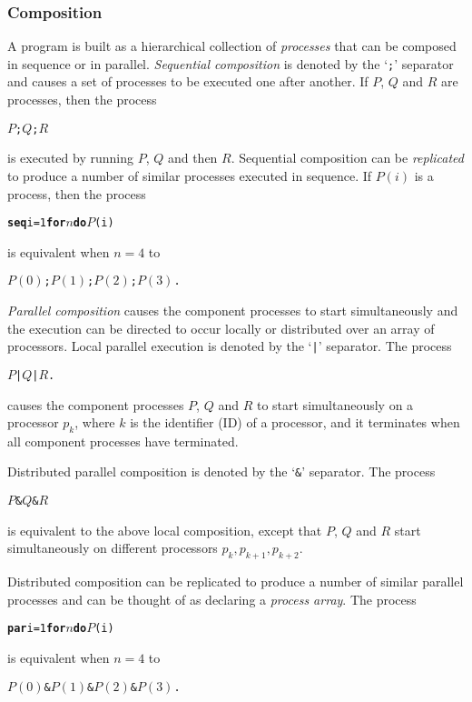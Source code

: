 \documentclass[11pt, conference, compsocconf, onecolumn]{IEEEtran}
\newcommand{\ttt}[1]{\texttt{#1}}
\newcounter{process}
\newcommand{\w}[1]{{\bf #1}}
\newcommand{\inputtikz}[1]{
\begin{center}\end{center}}
\def\codespacing{1.5mm}
\newenvironment{myquote}
{\list{}{\leftmargin=4mm\rightmargin=4mm}\item[]}
{\endlist}
\newcommand{\code}[1]{
\vspace{\codespacing}\begin{myquote}\begin{alltt}#1\end{alltt}\end{myquote}\vspace{\codespacing}
}
\begin{document}
\subsubsection{Composition}

A program is built as a hierarchical collection of \emph{processes} that can be
composed in sequence or in parallel. \emph{Sequential composition} is denoted
by the `\ttt{;}' separator and causes a set of processes to be executed one
after another. If $P$, $Q$ and $R$ are processes, then the process 
\code{$P$ ; $Q$ ; $R$} 
is executed by running $P$, $Q$ and then $R$.  Sequential composition can be
\emph{replicated} to produce a number of similar processes executed in
sequence. If $P(i)$ is a process, then the process
\code{\w{seq} i=1 \w{for} $n$ \w{do} $P$(i)}
is equivalent when $n=4$ to \code{$P(0)$ ; $P(1)$ ; $P(2)$ ; $P(3)$.}
\emph{Parallel composition} causes the component processes to start
simultaneously and the execution can be directed to occur locally or
distributed over an array of processors.  Local parallel execution is denoted
by the `\ttt{|}' separator. The process
\code{$P$ | $Q$ | $R$.}
causes the component processes $P$, $Q$ and $R$ to start simultaneously on a
processor $p_k$, where $k$ is the identifier (ID) of a processor, and it
terminates when all component processes have terminated.
\inputtikz{figures/par-composition-local}
Distributed parallel composition is denoted by the `\ttt{\&}' separator.
The process
\code{$P$ \& $Q$ \& $R$} 
is equivalent to the above local composition, except that $P$, $Q$
and $R$ start simultaneously on different processors $p_k, p_{k+1}, p_{k+2}$.
\inputtikz{figures/par-composition}
Distributed composition can be replicated to produce a number of similar
parallel processes and can be thought of as declaring a \emph{process array}.
The process 
\code{\w{par} i=1 \w{for} $n$ \w{do} $P$(i)}
is equivalent when $n=4$ to
\code{$P(0)$ \& $P(1)$ \& $P(2)$ \& $P(3)$.}
\end{document}
